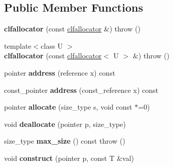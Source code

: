 \subsection*{Public Member Functions}
\begin{DoxyCompactItemize}
\item 
\hypertarget{structatl_1_1clfallocator_a8928d061c1c2a1dbab013e7326bb069b}{{\bfseries clfallocator} (const \hyperlink{structatl_1_1clfallocator}{clfallocator} \&)  throw ()}\label{structatl_1_1clfallocator_a8928d061c1c2a1dbab013e7326bb069b}

\item 
\hypertarget{structatl_1_1clfallocator_a1f5a58370ba67cf8a646bb86e445fc67}{{\footnotesize template$<$class U $>$ }\\{\bfseries clfallocator} (const \hyperlink{structatl_1_1clfallocator}{clfallocator}$<$ U $>$ \&)  throw ()}\label{structatl_1_1clfallocator_a1f5a58370ba67cf8a646bb86e445fc67}

\item 
\hypertarget{structatl_1_1clfallocator_a7a8b1f5f859ebc1cd1f8509ad681164c}{pointer {\bfseries address} (reference x) const }\label{structatl_1_1clfallocator_a7a8b1f5f859ebc1cd1f8509ad681164c}

\item 
\hypertarget{structatl_1_1clfallocator_a54cd719ba718b880e8a804b8734ab710}{const\+\_\+pointer {\bfseries address} (const\+\_\+reference x) const }\label{structatl_1_1clfallocator_a54cd719ba718b880e8a804b8734ab710}

\item 
\hypertarget{structatl_1_1clfallocator_aea65f52c1c20d0ebfcca437beb865a5d}{pointer {\bfseries allocate} (size\+\_\+type s, void const $\ast$=0)}\label{structatl_1_1clfallocator_aea65f52c1c20d0ebfcca437beb865a5d}

\item 
\hypertarget{structatl_1_1clfallocator_adbb84b7714c54c46cf34ca8046b444fc}{void {\bfseries deallocate} (pointer p, size\+\_\+type)}\label{structatl_1_1clfallocator_adbb84b7714c54c46cf34ca8046b444fc}

\item 
\hypertarget{structatl_1_1clfallocator_a01b57d577ebda86a68dea5d97efafff9}{size\+\_\+type {\bfseries max\+\_\+size} () const   throw ()}\label{structatl_1_1clfallocator_a01b57d577ebda86a68dea5d97efafff9}

\item 
\hypertarget{structatl_1_1clfallocator_af3fde57bd7401696b232dac995de70e2}{void {\bfseries construct} (pointer p, const T \&val)}\label{structatl_1_1clfallocator_af3fde57bd7401696b232dac995de70e2}


\end{DoxyCompactItemize}

